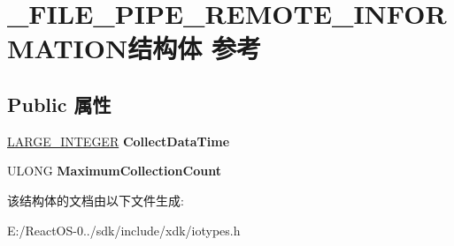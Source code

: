 \hypertarget{struct___f_i_l_e___p_i_p_e___r_e_m_o_t_e___i_n_f_o_r_m_a_t_i_o_n}{}\section{\+\_\+\+F\+I\+L\+E\+\_\+\+P\+I\+P\+E\+\_\+\+R\+E\+M\+O\+T\+E\+\_\+\+I\+N\+F\+O\+R\+M\+A\+T\+I\+O\+N结构体 参考}
\label{struct___f_i_l_e___p_i_p_e___r_e_m_o_t_e___i_n_f_o_r_m_a_t_i_o_n}
\subsection*{Public 属性}
\begin{DoxyCompactItemize}
\item 
\mbox{\label{struct___f_i_l_e___p_i_p_e___r_e_m_o_t_e___i_n_f_o_r_m_a_t_i_o_n_ad8b73d6668629f838915fbc7286e8119}} 
\hyperlink{union___l_a_r_g_e___i_n_t_e_g_e_r}{L\+A\+R\+G\+E\+\_\+\+I\+N\+T\+E\+G\+ER} {\bfseries Collect\+Data\+Time}
\item 
\mbox{\label{struct___f_i_l_e___p_i_p_e___r_e_m_o_t_e___i_n_f_o_r_m_a_t_i_o_n_a287d4432c17726b53fb42e3db6aa1fa7}} 
U\+L\+O\+NG {\bfseries Maximum\+Collection\+Count}
\end{DoxyCompactItemize}


该结构体的文档由以下文件生成\+:\begin{DoxyCompactItemize}
\item 
E\+:/\+React\+O\+S-\/0../sdk/include/xdk/iotypes.\+h\end{DoxyCompactItemize}
